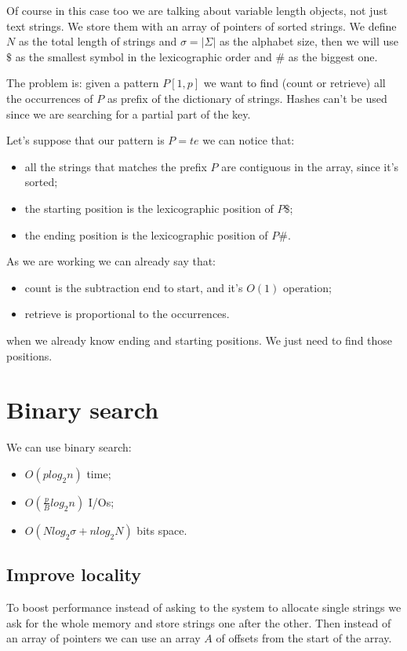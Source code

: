 Of course in this case too we are talking about variable length objects, not just text strings.
We store them with an array of pointers of sorted strings.
We define $N$ as the total length of strings and $\sigma = |\Sigma|$ as the alphabet size, then we will use $\$$ as the smallest symbol in the lexicographic order and $\#$ as the biggest one.

The problem is: given a pattern $P[1, p]$ we want to find (count or retrieve) all the occurrences of $P$ as prefix of the dictionary of strings.
Hashes can't be used since we are searching for a partial part of the key.

Let's suppose that our pattern is $P = te$ we can notice that:
\begin{itemize}
    \item all the strings that matches the prefix $P$ are contiguous in the array, since it's sorted;
    \item the starting position is the lexicographic position of $P\$$;
    \item the ending position is the lexicographic position of $P\#$.
\end{itemize}

As we are working we can already say that:
\begin{itemize}
    \item count is the subtraction end to start, and it's $O(1)$ operation;
    \item retrieve is proportional to the occurrences.
\end{itemize}
when we already know ending and starting positions.
We just need to find those positions.

\section{Binary search}
We can use binary search:
\begin{itemize}
    \item $O(p log_2 n)$ time;
    \item $O(\frac{p}{B}log_2 n)$ I/Os;
    \item $O(Nlog_2 \sigma + n log_2 N)$ bits space.
\end{itemize}


\subsection{Improve locality}
To boost performance instead of asking to the system to allocate single strings we ask for the whole memory and store strings one after the other.
Then instead of an array of pointers we can use an array $A$ of offsets from the start of the array.

